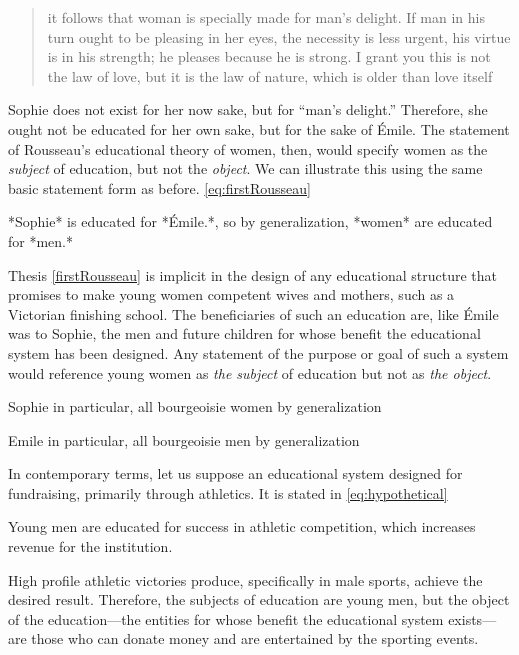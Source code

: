 \begin{quote}

it follows that woman is specially made for man's delight. If man in his turn ought to be pleasing in her eyes, the necessity is less urgent, his virtue is in his strength; he pleases because he is strong. I grant you this is not the law of love, but it is the law of nature, which is older than love itself ~\citep[p. 336]{Rousseau:2007vp}
\end{quote}

Sophie does not exist for her now sake, but for ``man's delight.'' Therefore, she ought not be educated for her own sake, but for the sake of Émile. The statement of Rousseau's educational theory of women, then, would specify women as the \emph{subject} of education, but not the \emph{object}. We can illustrate this using the same basic statement form as before.
\ref{eq:firstRousseau} 
\begin{purpose}\label{eq:firstRousseau}
*Sophie* is educated for *Émile.*, so by generalization, *women* are educated for *men.*\end{purpose}
 

Thesis \ref{firstRousseau} is implicit in the design of any educational structure that promises to make young women competent wives and mothers, such as a Victorian finishing school. The beneficiaries of such an education are, like Émile was to Sophie, the men and future children for whose benefit the educational system has been designed. Any statement of the purpose or goal of such a system would reference young women as \emph{the subject} of education but not as \emph{the object}. \begin{entities}Sophie in particular, all bourgeoisie women by generalization\end{entities}\begin{objects}Emile in particular, all bourgeoisie men by generalization\end{objects}

In contemporary terms, let us suppose an educational system designed for fundraising, primarily through athletics. It is stated in \ref{eq:hypothetical} 
\begin{purpose}\label{eq:hypothetical}
Young men are educated for success in athletic competition, which increases revenue for the institution.\end{purpose}
 High profile athletic victories produce, specifically in male sports, achieve the desired result. Therefore, the subjects of education are young men, but the object of the education---the entities for whose benefit the educational system exists---are those who can donate money and are entertained by the sporting events.

